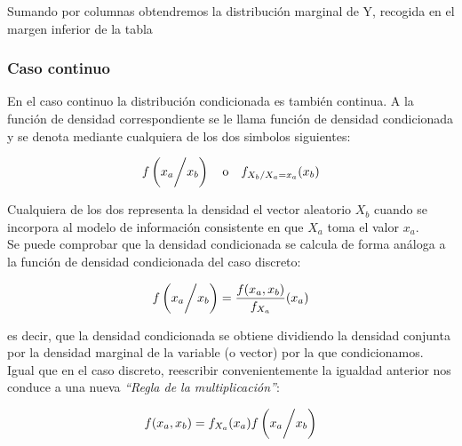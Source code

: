 \documentclass{article}
\begin{document}
\begin{theorem}
    Sumando por columnas obtendremos la distribución marginal de Y, recogida en el margen inferior de la tabla


\end{theorem}

\subsubsection{Caso continuo}
En el caso continuo la distribución condicionada es también continua. A la función de densidad correspondiente se le llama función
de densidad condicionada y se denota mediante cualquiera de los dos simbolos siguientes:

\[ f\left( x_a \bigg{/} x_b \right) \quad \text{o} \quad f_{X_b / X_a = x_a}(x_b) \]

Cualquiera de los dos representa la densidad el vector aleatorio $X_b$ cuando se incorpora al modelo de información consistente en
que $X_a$ toma el valor $x_a$. \\
Se puede comprobar que la densidad condicionada se calcula de forma análoga a la función de densidad condicionada del caso discreto:

\[ f\left( x_a \bigg{/} x_b \right) = \frac{f(x_a, x_b)}{f_{X_a}}(x_a) \]

es decir, que la densidad condicionada se obtiene dividiendo la densidad conjunta por la densidad marginal de la variable (o vector)
por la que condicionamos. \\
Igual que en el caso discreto, reescribir convenientemente la igualdad anterior nos conduce a una nueva \textit{``Regla de la multiplicación''}:

\[ f(x_a, x_b) = f_{X_a}(x_a)f\left( x_a \bigg{/} x_b \right) \]
\end{document}

